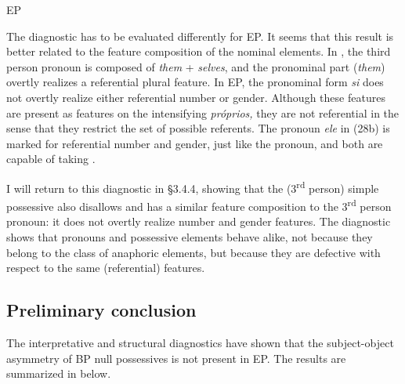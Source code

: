 \documentclass[output=paper]{langsci/langscibook}
\begin{document}
\ea%
    EP\label{ex:wein:28}\\
    \z
\z

The diagnostic has to be evaluated differently for EP. It seems that this result is better related to the feature composition of the nominal elements. In , the third person  pronoun is composed of \textit{them} + \textit{selves}, and the pronominal part (\textit{them}) overtly realizes a referential plural feature. In EP, the pronominal form \textit{si} does not overtly realize either referential number or gender. Although these features are present as  features on the intensifying  \textit{próprios,} they are not referential in the sense that they restrict the set of possible referents. The pronoun \textit{ele} in (28b) is marked for referential number and gender, just like the   pronoun, and both are capable of taking .

I will return to this diagnostic in §3.4.4, showing that the (3\textsuperscript{rd} person) simple possessive also disallows  and has a similar feature composition to the 3\textsuperscript{rd} person  pronoun: it does not overtly realize number and gender features. The diagnostic shows that  pronouns and possessive elements behave alike, not because they belong to the class of anaphoric elements, but because they are defective with respect to the same (referential) features.

\subsection{Preliminary conclusion}%

The interpretative and structural diagnostics have shown that the subject-object asymmetry of BP null possessives is not present in EP. The results are summarized in  below.
\end{document}
